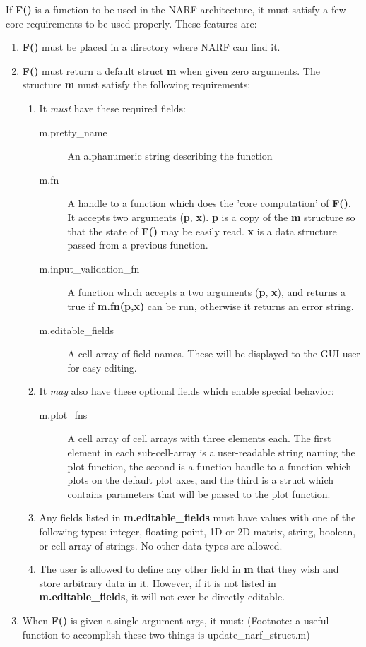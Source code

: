 \documentclass{article}
\begin{document}
If \textbf{F()} is a function to be used in the NARF architecture, it must satisfy a few core requirements to be used properly. These features are:
\begin{enumerate}
\item \textbf{F()} must be placed in a directory where NARF can find it. 
\item \textbf{F()} must return a default struct \textbf{m}
when given zero arguments. The structure \textbf{m} must satisfy
the following requirements:

\begin{enumerate}
\item It \emph{must }have these required fields:

\begin{description}
\item [{m.pretty\_name}] An alphanumeric string describing the function
\item [{m.fn}] A handle to a function which does the 'core computation'
of \textbf{F(). }It accepts two arguments (\textbf{p}, \textbf{x}).
\textbf{p} is a copy of the \textbf{m} structure so that the
state of\textbf{ F()} may be easily read. \textbf{x} is a data structure
passed from a previous function.
\item [{m.input\_validation\_fn}] A function which accepts a two arguments
(\textbf{p},\textbf{ x}), and returns a true if \textbf{m.fn(p,x)}
can be run, otherwise it returns an error string.
\item [{m.editable\_fields}] A cell array of field names. These will
be displayed to the GUI user for easy editing. 
\end{description}
\item It \emph{may} also have these optional fields which enable special
behavior:

\begin{description}
\item [{m.plot\_fns}] A cell array of cell arrays with three elements
each. The first element in each sub-cell-array is a user-readable
string naming the plot function, the second is a function handle to
a function which plots on the default plot axes, and the third is
a struct which contains parameters that will be passed to the plot
function. 
\end{description}
\item Any fields listed in \textbf{m.editable\_fields} must have values
with one of the following types: integer, floating point, 1D or 2D
matrix, string, boolean, or cell array of strings. No other data types
are allowed.
\item The user is allowed to define any other field in \textbf{m}
that they wish and store arbitrary data in it. However, if it is not
listed in \textbf{m.editable\_fields}, it will not ever be directly
editable.
\end{enumerate}
\item When \textbf{F() }is given a single argument args, it must:
(Footnote: a useful function to accomplish these two things is update\_narf\_struct.m)


\end{enumerate}
\end{document}
